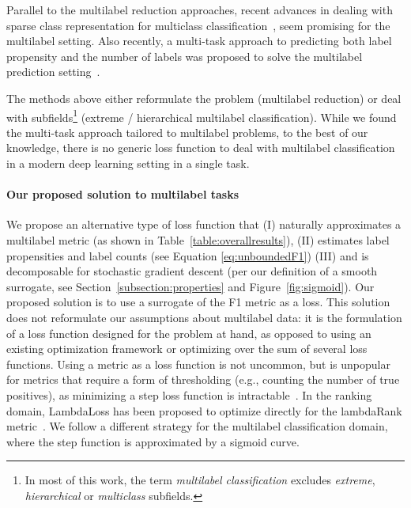 Parallel to the multilabel reduction approaches, recent advances in dealing with sparse class representation for multiclass classification~\citep{focalLoss,tencent}, seem promising for the multilabel setting. Also recently, a multi-task approach to predicting both label propensity and the number of labels was proposed to solve the multilabel prediction setting~\cite{multitaskLabel}.

The methods above either reformulate the problem (multilabel reduction) or deal with subfields\footnote{In most of this work, the term \emph{multilabel classification} excludes \emph{extreme}, \emph{hierarchical} or \emph{multiclass} subfields.} (extreme / hierarchical multilabel classification). While we found the multi-task approach tailored to multilabel problems, to the best of our knowledge, there is no generic loss function to deal with multilabel classification in a modern deep learning setting in a single task.



\paragraph{Our proposed solution to multilabel tasks}
We propose an alternative type of loss function that (I) naturally approximates a multilabel metric (as shown in Table~\ref{table:overallresults}), (II) estimates label propensities and label counts (see Equation \ref{eq:unboundedF1}) (III) and is decomposable for stochastic gradient descent (per our definition of a smooth surrogate, see Section~\ref{subsection:properties} and Figure~\ref{fig:sigmoid}). Our proposed solution is to use a surrogate of the F1 metric as a loss. This solution does not reformulate our assumptions about multilabel data: it is the formulation of a loss function designed for the problem at hand, as opposed to using an existing optimization framework or optimizing over the sum of several loss functions.
Using a metric as a loss function is not uncommon, but is unpopular for metrics that require a form of thresholding (e.g., counting the number of true positives), as minimizing a step loss function is intractable~\cite{stochasticNegativeMining}. In the ranking domain, LambdaLoss has been proposed to optimize directly for the lambdaRank metric~\cite{lambdaLoss}. We follow a different strategy for the multilabel classification domain, where the step function is approximated by a sigmoid curve. 

